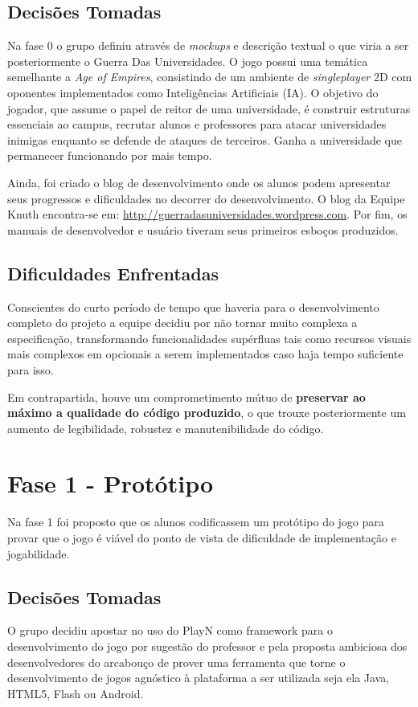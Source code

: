 \documentclass[brazil,times]{abnt}
\begin{document}
\subsection{Decisões Tomadas}
Na fase 0 o grupo definiu através de \emph{mockups} e descrição textual o que
viria a ser posteriormente o Guerra Das Universidades. O jogo possui uma
temática semelhante a \emph{Age of Empires}, consistindo de um
ambiente de \emph{singleplayer} 2D com oponentes implementados como
Inteligências Artificiais (IA). O objetivo do jogador, que assume o papel de
reitor de uma universidade, é construir estruturas essenciais ao campus, recrutar
alunos e professores para atacar universidades inimigas enquanto se defende de
ataques de terceiros. Ganha a universidade que permanecer funcionando por mais
tempo.

Ainda, foi criado o blog de desenvolvimento onde os alunos podem apresentar seus
progressos e dificuldades no decorrer do desenvolvimento. O blog da Equipe Knuth
encontra-se em: \url{http://guerradasuniversidades.wordpress.com}. Por fim, os
manuais de desenvolvedor e usuário tiveram seus primeiros esboços produzidos. 

\subsection{Dificuldades Enfrentadas}
Conscientes do curto período de tempo que haveria para o desenvolvimento
completo do projeto a equipe decidiu por não tornar muito complexa a
especificação, transformando funcionalidades supérfluas tais como recursos
visuais mais complexos em opcionais a serem implementados caso haja
tempo suficiente para isso.

Em contrapartida, houve um comprometimento mútuo de \textbf{preservar ao máximo a
qualidade do código produzido}, o que trouxe posteriormente um aumento de
legibilidade, robustez e manutenibilidade do código.


\section{Fase 1 - Protótipo}
Na fase 1 foi proposto que os alunos codificassem um protótipo do jogo para
provar que o jogo é viável do ponto de vista de dificuldade de implementação e
jogabilidade.

\subsection{Decisões Tomadas}
O grupo decidiu apostar no uso do PlayN como framework para o desenvolvimento do
jogo por sugestão do professor e pela proposta ambiciosa dos desenvolvedores do
arcabouço de prover uma ferramenta que torne o desenvolvimento de jogos
agnóstico à plataforma a ser utilizada seja ela Java, HTML5, Flash ou Android.
\end{document}
